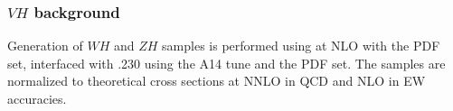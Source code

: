 \documentclass[../thesis.tex]{subfiles}
\begin{document}
\subsubsection*{$VH$ background}
Generation of $WH$ and $ZH$ samples is performed using \powhegbox \citep{Frixione:2007nw,Nason:2004rx,Frixione:2007vw,Alioli:2010xd} at \acs{NLO} with the \nnpdfaznlo \citep{Ball:2014uwa} \acs{PDF} set, interfaced with \pythia.230 \citep{Sjostrand:2014zea} using the A14 tune \citep{ATL-PHYS-PUB-2014-021} and the \nnpdftwo \citep{Ball:2012cx} \acs{PDF} set. The samples are normalized to theoretical cross sections at \acs{NNLO} in \acs{QCD} and \acs{NLO} in \acs{EW} accuracies.
\end{document}
